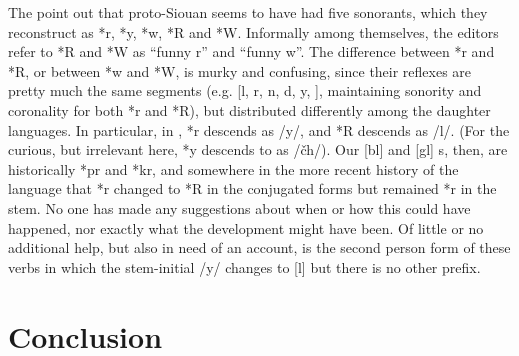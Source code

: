 \documentclass[output=paper]{LSP/langsci}
\begin{document}
The \textit{} \citep{RankinEtAl1998,Rankinetal2015AccessSeptember} point out that proto-Siouan seems to have had five sonorants, which they reconstruct as *r, *y, *w, *R and *W. Informally among themselves, the  editors refer to *R and *W as ``funny r'' and ``funny w''. The difference between *r and *R, or between *w and *W, is murky and confusing, since their reflexes are pretty much the same segments (e.g. [l, r, n, d, y, ], maintaining sonority and coronality for both *r and *R), but distributed differently among the daughter languages. In particular, in , *r descends as /y/, and *R descends as /l/. (For the curious, but irrelevant here, *y descends to  as /\v{c}h/). Our [bl] and [gl] s, then, are historically *pr and *kr, and somewhere in the more recent history of the language that *r changed to *R in the conjugated forms but remained *r in the stem. No one has made any suggestions about when or how this could have happened, nor exactly what the development might have been. Of little or no additional help, but also in need of an account, is the second person form of these verbs in which the stem-initial /y/ changes to [l] but there is no other prefix.

\section{Conclusion}
\end{document}
